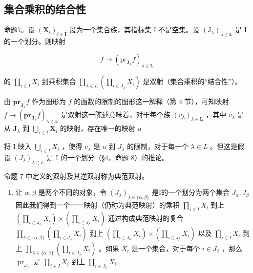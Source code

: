 \subsection{集合乘积的结合性}

命题7。设 \((\mathbf{X}_t)_{t \in \mathbf{I}}\) 设为一个集合族，其指标集 I 不是空集。设 \((\mathrm{J}_{\lambda})_{\lambda \in \mathbf{L}}\) 是 I 的一个划分。则映射

\[
f \rightarrow (\mathrm{pr} _ {\mathbf {J} _ {\lambda}} f) _ {\lambda \in \mathbf {L}}
\]

的 \(\prod_{i\in I}X_i\) 到乘积集合 \(\prod_{\lambda \in L}\left(\prod_{i\in J_\lambda}X_i\right)\) 是双射（集合乘积的“结合性”）。

由 \(\mathbf{pr}_{\mathbf{J}_{\lambda}}f\) 作为图形为 \(f\) 的函数的限制的图形这一解释（第 4 节），可知映射 \(f \to (\mathbf{pr}_{\mathbf{J}_{\lambda}}f)_{\lambda \in \mathbf{L}}\) 是双射这一陈述意味着，对于每个族 \((v_{\lambda})_{\lambda \in \mathbf{L}}\) ，其中 \(v_{\lambda}\) 是从 \(\mathbf{J}_{\lambda}\) 到 \(\bigcup_{i\in I}\mathbf{X}_i\) 的映射，存在唯一的映射 \(u\)

将 I 映入 \(\bigcup_{i\in I}X_i\) ，使得 \(v_{\lambda}\) 是 \(u\) 到 \(J_{\lambda}\) 的限制，对于每一个 \(\lambda\in L\) 。但这是假设 \((J_{\lambda})_{\lambda\in L}\) 是 I 的一个划分（§4，命题 8）的推论。

命题 7 中定义的双射及其逆双射称为典范双射。


\begin{enumerate}
\def\labelenumi{(\arabic{enumi})}
\tightlist
\item
  让 \(\alpha, \beta\) 是两个不同的对象，令 \((J_{\lambda})_{\lambda \in \{\alpha, \beta\}}\) 是I的一个划分为两个集合 \(J_{\alpha}, J_{\beta}\) 因此我们得到一个一一映射（仍称为典范映射）的乘积 \(\prod_{i \in I} X_i\) 到上 \(\left(\prod_{i \in J_{\alpha}} X_i\right) \times \left(\prod_{i \in J_{\beta}} X_i\right)\) 通过构成典范映射的复合 \(\prod_{\lambda \in \{\alpha, \beta\}} \left(\prod_{i \in J_{\lambda}} X_i\right)\) 到上 \(\left(\prod_{i \in J_{\alpha}} X_i\right) \times \left(\prod_{i \in J_{\beta}} X_i\right)\) 以及 \(\prod_{i \in I} X_i\) 到上 \(\prod_{\lambda \in \{\alpha, \beta\}} \left(\prod_{i \in J_{\lambda}} X_i\right)\) 。如果 \(X_i\) 是一个集合，对于每个 \(i \in J_{\beta}\) ，那么 \(\operatorname{pr}_{J_{\alpha}}\) 是 \(\prod_{i \in I} X_i\) 到上 \(\prod_{i \in J_{\beta}} X_i\) .
\end{enumerate}

